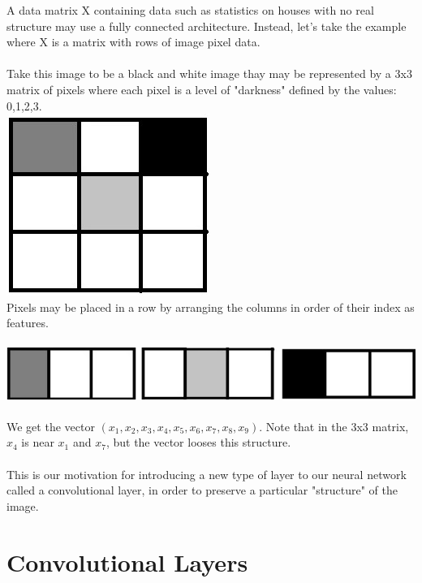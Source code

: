 \begin{example}
A data matrix X containing data such as statistics on houses with no real structure may use a fully connected architecture. Instead, let's take the example where X is a matrix with rows  of image pixel data. \\\\ Take this image to be a black and white image thay may be represented by a 3x3 matrix of pixels where each pixel is a level of "darkness" defined by the values: 0,1,2,3.\\

\includegraphics[scale=0.40]{images/Chapter 11/pic1.png}
\quad
\\
Pixels may be placed in a row by arranging the columns in order of their index as features.\\\\
\includegraphics[scale=0.40]{images/Chapter 11/pic2.png}
\\\\
We get the vector $(x_1,x_2,x_3,x_4,x_5,x_6,x_7,x_8,x_9)$.
Note that in the 3x3 matrix, $x_4$ is near $x_1$ and $x_7$, but the vector looses this structure. \\\\
This is our motivation for introducing a new type of layer to our neural network called a convolutional layer, in order to preserve a particular "structure" of the image. 

\end{example}


\section{Convolutional Layers}
